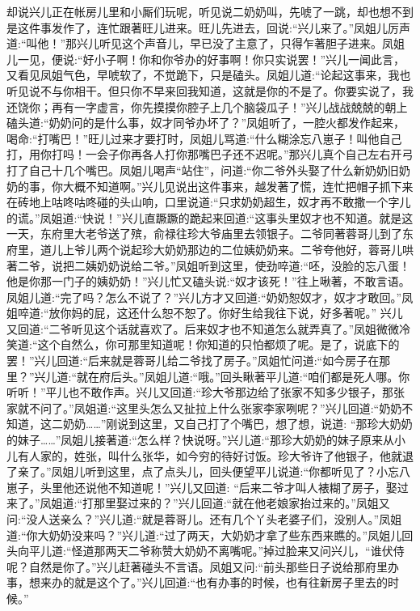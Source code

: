 \begin{parag}
    却说兴儿正在帐房儿里和小厮们玩呢，听见说二奶奶叫，先唬了一跳，却也想不到是这件事发作了，连忙跟著旺儿进来。旺儿先进去，回说:“兴儿来了。”凤姐儿厉声道:“叫他！”那兴儿听见这个声音儿，早已没了主意了，只得乍著胆子进来。凤姐儿一见，便说:“好小子啊！你和你爷办的好事啊！你只实说罢！”兴儿一闻此言，又看见凤姐气色，早唬软了，不觉跪下，只是磕头。凤姐儿道:“论起这事来，我也听见说不与你相干。但只你不早来回我知道，这就是你的不是了。你要实说了，我还饶你；再有一字虚言，你先摸摸你腔子上几个脑袋瓜子！”兴儿战战兢兢的朝上磕头道:“奶奶问的是什么事，奴才同爷办坏了？”凤姐听了，一腔火都发作起来，喝命:“打嘴巴！”旺儿过来才要打时，凤姐儿骂道:“什么糊涂忘八崽子！叫他自己打，用你打吗！一会子你再各人打你那嘴巴子还不迟呢。”那兴儿真个自己左右开弓打了自己十几个嘴巴。凤姐儿喝声“站住”，问道:“你二爷外头娶了什么新奶奶旧奶奶的事，你大概不知道啊。”兴儿见说出这件事来，越发著了慌，连忙把帽子抓下来在砖地上咕咚咕咚碰的头山响，口里说道:“只求奶奶超生，奴才再不敢撒一个字儿的谎。”凤姐道:“快说！”兴儿直蹶蹶的跪起来回道:“这事头里奴才也不知道。就是这一天，东府里大老爷送了殡，俞禄往珍大爷庙里去领银子。二爷同著蓉哥儿到了东府里，道儿上爷儿两个说起珍大奶奶那边的二位姨奶奶来。二爷夸他好，蓉哥儿哄著二爷，说把二姨奶奶说给二爷。”凤姐听到这里，使劲啐道:“呸，没脸的忘八蛋！他是你那一门子的姨奶奶！”兴儿忙又磕头说:“奴才该死！”往上啾著，不敢言语。凤姐儿道:“完了吗？怎么不说了？”兴儿方才又回道:“奶奶恕奴才，奴才才敢回。”凤姐啐道:“放你妈的屁，这还什么恕不恕了。你好生给我往下说，好多著呢。” 兴儿又回道:“二爷听见这个话就喜欢了。后来奴才也不知道怎么就弄真了。”凤姐微微冷笑道:“这个自然么，你可那里知道呢！你知道的只怕都烦了呢。是了，说底下的罢！”兴儿回道:“后来就是蓉哥儿给二爷找了房子。”凤姐忙问道:“如今房子在那里？”兴儿道:“就在府后头。”凤姐儿道:“哦。”回头瞅著平儿道:“咱们都是死人哪。你听听！”平儿也不敢作声。兴儿又回道:“珍大爷那边给了张家不知多少银子，那张家就不问了。”凤姐道:“这里头怎么又扯拉上什么张家李家咧呢？”兴儿回道:“奶奶不知道，这二奶奶……”刚说到这里，又自己打了个嘴巴，想了想，说道: “那珍大奶奶的妹子……”凤姐儿接著道:“怎么样？快说呀。”兴儿道:“那珍大奶奶的妹子原来从小儿有人家的，姓张，叫什么张华，如今穷的待好讨饭。珍大爷许了他银子，他就退了亲了。”凤姐儿听到这里，点了点头儿，回头便望平儿说道:“你都听见了？小忘八崽子，头里他还说他不知道呢！”兴儿又回道: “后来二爷才叫人裱糊了房子，娶过来了。”凤姐道:“打那里娶过来的？”兴儿回道:“就在他老娘家抬过来的。”凤姐又问:“没人送亲么？”兴儿道:“就是蓉哥儿。还有几个丫头老婆子们，没别人。”凤姐道:“你大奶奶没来吗？”兴儿道:“过了两天，大奶奶才拿了些东西来瞧的。”凤姐儿回头向平儿道:“怪道那两天二爷称赞大奶奶不离嘴呢。”掉过脸来又问兴儿，“谁伏侍呢？自然是你了。”兴儿赶著碰头不言语。凤姐又问:“前头那些日子说给那府里办事，想来办的就是这个了。”兴儿回道:“也有办事的时候，也有往新房子里去的时候。”
\end{parag}


